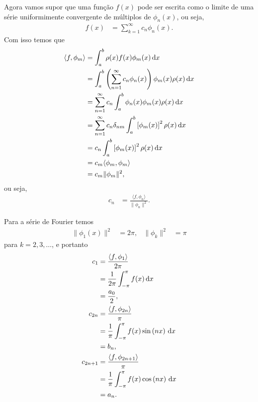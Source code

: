 Agora vamos supor que uma função $f(x)$ pode ser escrita como o limite de uma série uniformimente convergente de múltiplos de $\phi_n(x)$, ou seja,
\begin{align*}
    f(x) &= \sum_{k = 1}^\infty c_n \phi_n(x).
\end{align*}
Com isso temos que
\begin{align*}
    \langle f,\phi_m \rangle &= \int_a^b \rho(x) f(x) \phi_m(x) \, \mathrm{d}x \\
    &= \int_a^b \left( \sum_{n = 1}^\infty c_n \phi_n(x) \right) \phi_m(x) \rho(x) \, \mathrm{d}x \\
    &= \sum_{n = 1}^\infty c_n \int_a^b \phi_n(x) \phi_m(x) \rho(x) \, \mathrm{d}x \\
    &= \sum_{n = 1}^\infty c_n \delta_{nm} \int_a^b \left[ \phi_m(x) \right]^2 \rho(x) \, \mathrm{d}x \\
    &= c_n \int_a^b \left[ \phi_m(x) \right]^2 \rho(x) \, \mathrm{d}x \\
    &= c_m \langle \phi_m, \phi_m \rangle \\
    &= c_m \| \phi_m \|^2,
\end{align*}
ou seja,
\begin{align*}
    c_n &= \frac{\langle f, \phi_n \rangle}{\| \phi_n \|^2}.
\end{align*}

\begin{exem}
    Para a série de Fourier temos
    \begin{align*}
        \| \phi_1(x) \|^2 &= 2 \pi, & \| \phi_k \|^2 &= \pi
    \end{align*}
    para $k = 2, 3, \ldots$, e portanto
    \begin{align*}
        c_1 &= \frac{\langle f, \phi_1 \rangle}{2\pi} \\
        &= \frac{1}{2\pi} \int_{-\pi}^\pi f(x) \, \mathrm{d}x \\
        &= \frac{a_0}{2}, \\
        c_{2n} &= \frac{\langle f, \phi_{2n} \rangle}{\pi} \\
        &= \frac{1}{\pi} \int_{-\pi}^\pi f(x) \sin\left( n x \right) \, \mathrm{d}x \\
        &= b_n, \\
        c_{2n + 1} &= \frac{\langle f, \phi_{2n + 1} \rangle}{\pi} \\
        &= \frac{1}{\pi} \int_{-\pi}^\pi f(x) \cos\left( n x \right) \, \mathrm{d}x \\
        &= a_n.
    \end{align*}
\end{exem}

